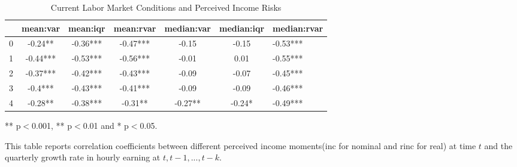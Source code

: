 \begin{table}[ht]
\centering
\begin{adjustbox}{width={\textwidth}}
\begin{threeparttable}
\caption{Current Labor Market Conditions and Perceived Income Risks}
\label{macro_corr_he}
\begin{tabular}{ccccccl}
\toprule
{} &  mean:var &  mean:iqr & mean:rvar & median:var & median:iqr & median:rvar \\
\midrule
0 &   -0.24** &  -0.36*** &  -0.47*** &      -0.15 &      -0.15 &    -0.53*** \\
1 &  -0.44*** &  -0.53*** &  -0.56*** &      -0.01 &       0.01 &    -0.55*** \\
2 &  -0.37*** &  -0.42*** &  -0.43*** &      -0.09 &      -0.07 &    -0.45*** \\
3 &   -0.4*** &  -0.43*** &  -0.41*** &      -0.09 &      -0.09 &    -0.46*** \\
4 &   -0.28** &  -0.38*** &   -0.31** &    -0.27** &     -0.24* &    -0.49*** \\
\bottomrule
\end{tabular}
\begin{tablenotes}
\item *** p$<$0.001, ** p$<$0.01 and * p$<$0.05.
\item This table reports correlation coefficients between different perceived income moments(inc for nominal
and rinc for real) at time
$t$ and the quarterly growth rate in hourly earning at $t,t-1,...,t-k$.
\end{tablenotes}
\end{threeparttable}
\end{adjustbox}
\end{table}
	
